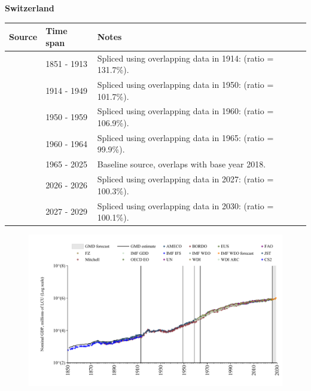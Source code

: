 \documentclass[12pt,a4paper,landscape]{article}
\begin{document}
\begin{adjustbox}{max totalsize={\paperwidth}{\paperheight},center}
\begin{minipage}[t][\textheight][t]{\textwidth}
\vspace*{0.5cm}
{}
\begin{center}
{\Large\bfseries Switzerland}
\end{center}
\vspace{0.5cm}
\begin{table}[H]
\centering
\small
\begin{tabular}{|l|l|l|}
\hline
\textbf{Source} & \textbf{Time span} & \textbf{Notes} \\
\hline
\rowcolor{white}\cite{CS2_CHE}& 1851 - 1913 &Spliced using overlapping data in 1914: (ratio = 131.7\%).\\
\rowcolor{lightgray}\cite{JST}& 1914 - 1949 &Spliced using overlapping data in 1950: (ratio = 101.7\%).\\
\rowcolor{white}\cite{IMF_GDD}& 1950 - 1959 &Spliced using overlapping data in 1960: (ratio = 106.9\%).\\
\rowcolor{lightgray}\cite{AMECO}& 1960 - 1964 &Spliced using overlapping data in 1965: (ratio = 99.9\%).\\
\rowcolor{white}\cite{OECD_EO}& 1965 - 2025 &Baseline source, overlaps with base year 2018.\\
\rowcolor{lightgray}\cite{AMECO}& 2026 - 2026 &Spliced using overlapping data in 2027: (ratio = 100.3\%).\\
\rowcolor{white}\cite{IMF_WEO_forecast}& 2027 - 2029 &Spliced using overlapping data in 2030: (ratio = 100.1\%).\\
\hline
\end{tabular}
\end{table}
\begin{figure}[H]
\centering
\includegraphics[width=\textwidth,height=0.6\textheight,keepaspectratio]{graphs/CHE_nGDP.pdf}
\end{figure}
\end{minipage}
\end{adjustbox}
\end{document}
